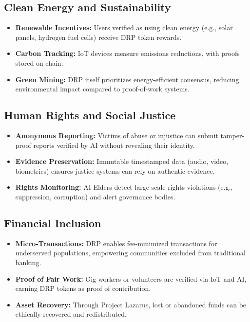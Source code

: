 \documentclass[11pt,a4paper]{article}
\begin{document}
\subsection{Clean Energy and Sustainability}
\begin{itemize}
    \item \textbf{Renewable Incentives:} Users verified as using clean energy (e.g., solar panels, hydrogen fuel cells) receive DRP token rewards.
    \item \textbf{Carbon Tracking:} IoT devices measure emissions reductions, with proofs stored on-chain.
    \item \textbf{Green Mining:} DRP itself prioritizes energy-efficient consensus, reducing environmental impact compared to proof-of-work systems.
\end{itemize}

\subsection{Human Rights and Social Justice}
\begin{itemize}
    \item \textbf{Anonymous Reporting:} Victims of abuse or injustice can submit tamper-proof reports verified by AI without revealing their identity.
    \item \textbf{Evidence Preservation:} Immutable timestamped data (audio, video, biometrics) ensures justice systems can rely on authentic evidence.
    \item \textbf{Rights Monitoring:} AI Elders detect large-scale rights violations (e.g., suppression, corruption) and alert governance bodies.
\end{itemize}

\subsection{Financial Inclusion}
\begin{itemize}
    \item \textbf{Micro-Transactions:} DRP enables fee-minimized transactions for underserved populations, empowering communities excluded from traditional banking.
    \item \textbf{Proof of Fair Work:} Gig workers or volunteers are verified via IoT and AI, earning DRP tokens as proof of contribution.
    \item \textbf{Asset Recovery:} Through Project Lazarus, lost or abandoned funds can be ethically recovered and redistributed.
\end{itemize}
\end{document}
